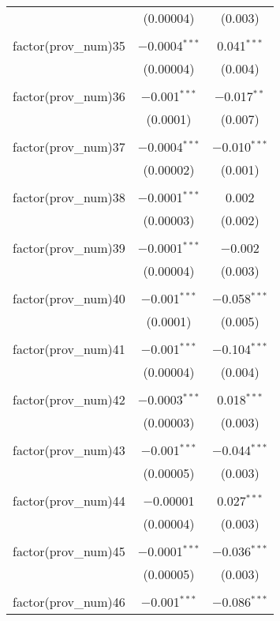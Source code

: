 \begin{table}[!htbp]
\begin{tabular}{@{\extracolsep{5pt}}lcc}
  & (0.00004) & (0.003) \\ 
  & & \\ 
 factor(prov\_num)35 & $-$0.0004$^{***}$ & 0.041$^{***}$ \\ 
  & (0.00004) & (0.004) \\ 
  & & \\ 
 factor(prov\_num)36 & $-$0.001$^{***}$ & $-$0.017$^{**}$ \\ 
  & (0.0001) & (0.007) \\ 
  & & \\ 
 factor(prov\_num)37 & $-$0.0004$^{***}$ & $-$0.010$^{***}$ \\ 
  & (0.00002) & (0.001) \\ 
  & & \\ 
 factor(prov\_num)38 & $-$0.0001$^{***}$ & 0.002 \\ 
  & (0.00003) & (0.002) \\ 
  & & \\ 
 factor(prov\_num)39 & $-$0.0001$^{***}$ & $-$0.002 \\ 
  & (0.00004) & (0.003) \\ 
  & & \\ 
 factor(prov\_num)40 & $-$0.001$^{***}$ & $-$0.058$^{***}$ \\ 
  & (0.0001) & (0.005) \\ 
  & & \\ 
 factor(prov\_num)41 & $-$0.001$^{***}$ & $-$0.104$^{***}$ \\ 
  & (0.00004) & (0.004) \\ 
  & & \\ 
 factor(prov\_num)42 & $-$0.0003$^{***}$ & 0.018$^{***}$ \\ 
  & (0.00003) & (0.003) \\ 
  & & \\ 
 factor(prov\_num)43 & $-$0.001$^{***}$ & $-$0.044$^{***}$ \\ 
  & (0.00005) & (0.003) \\ 
  & & \\ 
 factor(prov\_num)44 & $-$0.00001 & 0.027$^{***}$ \\ 
  & (0.00004) & (0.003) \\ 
  & & \\ 
 factor(prov\_num)45 & $-$0.0001$^{***}$ & $-$0.036$^{***}$ \\ 
  & (0.00005) & (0.003) \\ 
  & & \\ 
 factor(prov\_num)46 & $-$0.001$^{***}$ & $-$0.086$^{***}$ \\ 

\end{tabular}
\end{table}
